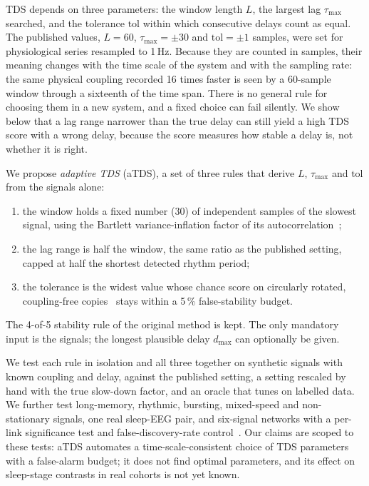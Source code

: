 \documentclass[11pt,a4paper]{article}
\newcommand{\tmax}{\tau_{\max}}
\newcommand{\tol}{\mathrm{tol}}
\begin{document}
TDS depends on three parameters: the window length $L$, the largest lag $\tmax$ searched, and the tolerance $\tol$ within which consecutive delays count as equal. The published values, $L = 60$, $\tmax = \pm30$ and $\tol = \pm1$ samples, were set for physiological series resampled to 1\,Hz. Because they are counted in samples, their meaning changes with the time scale of the system and with the sampling rate: the same physical coupling recorded 16 times faster is seen by a 60-sample window through a sixteenth of the time span. There is no general rule for choosing them in a new system, and a fixed choice can fail silently. We show below that a lag range narrower than the true delay can still yield a high TDS score with a wrong delay, because the score measures how stable a delay is, not whether it is right.

We propose \emph{adaptive TDS} (aTDS), a set of three rules that derive $L$, $\tmax$ and $\tol$ from the signals alone:
\begin{enumerate}
\item the window holds a fixed number (30) of independent samples of the slowest signal, using the Bartlett variance-inflation factor of its autocorrelation~\cite{bartlett1946theoretical,bayley1946effective};
\item the lag range is half the window, the same ratio as the published setting, capped at half the shortest detected rhythm period;
\item the tolerance is the widest value whose chance score on circularly rotated, coupling-free copies~\cite{theiler1992testing,schreiber2000surrogate,lancaster2018surrogate} stays within a 5\,\% false-stability budget.
\end{enumerate}
The 4-of-5 stability rule of the original method is kept. The only mandatory input is the signals; the longest plausible delay $d_{\max}$ can optionally be given.

We test each rule in isolation and all three together on synthetic signals with known coupling and delay, against the published setting, a setting rescaled by hand with the true slow-down factor, and an oracle that tunes on labelled data. We further test long-memory, rhythmic, bursting, mixed-speed and non-stationary signals, one real sleep-EEG pair, and six-signal networks with a per-link significance test and false-discovery-rate control~\cite{benjamini1995controlling}. Our claims are scoped to these tests: aTDS automates a time-scale-consistent choice of TDS parameters with a false-alarm budget; it does not find optimal parameters, and its effect on sleep-stage contrasts in real cohorts is not yet known.
\end{document}
